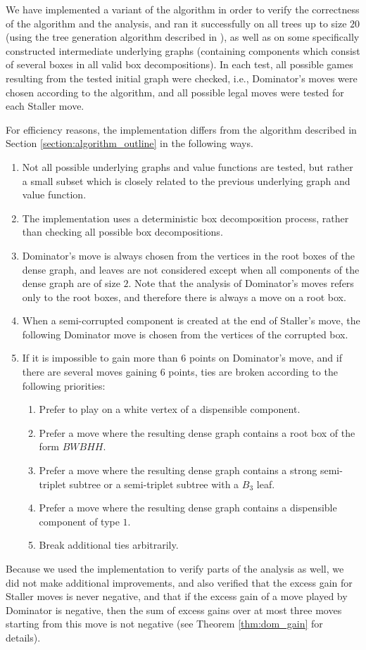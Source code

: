 \documentclass[11pt]{article}
\def\dnsitem{\vspace{-7pt}\item}
\theoremstyle{definition}
\begin{document}
We have implemented a variant of the algorithm in order to verify the correctness of the algorithm and the analysis, 
and ran it successfully on all trees up to size $20$ (using the tree generation algorithm described in \cite{wright1986constant}),
as well as on some specifically constructed intermediate underlying graphs (containing components which consist of several boxes in all valid box decompositions).
In each test, all possible games resulting from the tested initial graph were checked, i.e., Dominator's moves were chosen according to the algorithm, and all possible legal moves were tested for each Staller move.

For efficiency reasons, the implementation differs from the algorithm described in Section \ref{section:algorithm_outline} in the following ways.
\begin{enumerate}
	\dnsitem Not all possible underlying graphs and value functions are tested, but rather a small subset which is closely related to the previous underlying graph and value function.
	\dnsitem The implementation uses a deterministic box decomposition process, rather than checking all possible box decompositions. 
	\dnsitem Dominator's move is always chosen from the vertices in the root boxes of the dense graph, and leaves are not considered except when all components of the dense graph are of size $2$.
	Note that the analysis of Dominator's moves refers only to the root boxes, and therefore there is always a move on a root box.
	\dnsitem When a semi-corrupted component is created at the end of Staller's move, the following Dominator move is chosen from the vertices of the corrupted box.
	\dnsitem If it is impossible to gain more than $6$ points on Dominator's move, and if there are several moves gaining $6$ points, ties are broken according to the following priorities:
	\begin{enumerate}
		\dnsitem Prefer to play on a white vertex of a dispensible component.
		\dnsitem Prefer a move where the resulting dense graph contains a root box of the form $BWBHH$.
		\dnsitem Prefer a move where the resulting dense graph contains a strong semi-triplet subtree or a semi-triplet subtree with a $B_3$ leaf.
		\dnsitem Prefer a move where the resulting dense graph contains a dispensible component of type $1$. 
		\dnsitem Break additional ties arbitrarily.
	\end{enumerate}
\end{enumerate}

Because we used the implementation to verify parts of the analysis as well, we did not make additional improvements, and also verified that the excess gain for Staller moves is never negative, 
and that if the excess gain of a move played by Dominator is negative, then the sum of excess gains over at most three moves starting from this move is not negative (see Theorem \ref{thm:dom_gain} for details).
\end{document}
